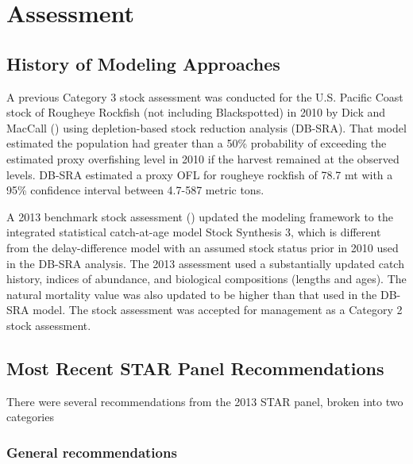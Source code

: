 \documentclass[
]{scrartcl}
\begin{document}
\newpage{}

\section{Assessment}\label{assessment}

\subsection{History of Modeling
Approaches}\label{history-of-modeling-approaches}

A previous Category 3 stock assessment was conducted for the U.S.
Pacific Coast stock of Rougheye Rockfish (not including Blackspotted) in
2010 by Dick and MacCall ()
using depletion-based stock reduction analysis (DB-SRA). That model
estimated the population had greater than a 50\% probability of
exceeding the estimated proxy overfishing level in 2010 if the harvest
remained at the observed levels. DB-SRA estimated a proxy OFL for
rougheye rockfish of 78.7 mt with a 95\% confidence interval between
4.7-587 metric tons.

A 2013 benchmark stock assessment
()
updated the modeling framework to the integrated statistical
catch-at-age model Stock Synthesis 3, which is different from the
delay-difference model with an assumed stock status prior in 2010 used
in the DB-SRA analysis. The 2013 assessment used a substantially updated
catch history, indices of abundance, and biological compositions
(lengths and ages). The natural mortality value was also updated to be
higher than that used in the DB-SRA model. The stock assessment was
accepted for management as a Category 2 stock assessment.

\subsection{Most Recent STAR Panel
Recommendations}\label{most-recent-star-panel-recommendations}

There were several recommendations from the 2013 STAR panel, broken into
two categories

\subsubsection{General recommendations}\label{general-recommendations}
\end{document}
